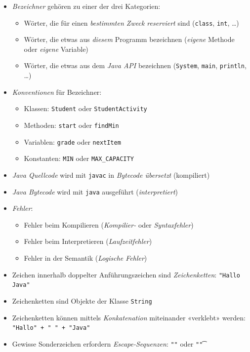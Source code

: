 \documentclass[a4paper,10pt, dvipsnames]{report}
\newcommand{\javaInLine}[1]{\texttt{#1}}
\begin{document}
\begin{itemize}
    \item \textit{Bezeichner} gehören zu einer der drei Kategorien:
    \begin{itemize}
        \item Wörter, die für einen \textit{bestimmten Zweck reserviert} sind (\javaInLine{class}, \javaInLine{int}, \ldots )
        \item Wörter, die etwas aus \textit{diesem} Programm bezeichnen (\textit{eigene} Methode oder \textit{eigene} Variable)
        \item Wörter, die etwas aus dem \textit{Java API} bezeichnen (\javaInLine{System}, \javaInLine{main}, \javaInLine{println}, \ldots )
    \end{itemize}
    \item \textit{Konventionen} für Bezeichner:
    \begin{itemize}
        \item Klassen: \javaInLine{Student} oder \javaInLine{StudentActivity}
        \item Methoden: \javaInLine{start} oder \javaInLine{findMin}
        \item Variablen: \javaInLine{grade} oder \javaInLine{nextItem}
        \item Konstanten: \javaInLine{MIN} oder \javaInLine{MAX_CAPACITY}
    \end{itemize}
	\item \textit{Java Quellcode} wird mit \javaInLine{javac} in \textit{Bytecode übersetzt} (kompiliert)
	\item \textit{Java Bytecode} wird mit \javaInLine{java} ausgeführt (\textit{interpretiert})
	\item \textit{Fehler}:
	\begin{itemize}
        \item Fehler beim Kompilieren (\textit{Kompilier-} oder \textit{Syntaxfehler})
        \item Fehler beim Interpretieren (\textit{Laufzeitfehler})
        \item Fehler in der Semantik (\textit{Logische Fehler})
    \end{itemize}
	\item Zeichen innerhalb doppelter Anführungszeichen sind \textit{Zeichenketten}: \javaInLine{"Hallo Java"}
	\item Zeichenketten sind Objekte der Klasse \javaInLine{String}
	\item Zeichenketten können mittels \textit{Konkatenation} miteinander «verklebt» werden: \javaInLine{"Hallo" + " " + "Java"}
	\item Gewisse Sonderzeichen erfordern \textit{Escape-Sequenzen}: \javaInLine{"\n"} oder \javaInLine{"\t"}
\end{itemize}
\end{document}
